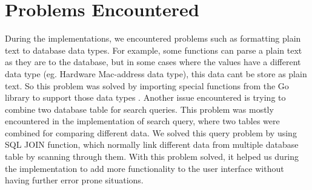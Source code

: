 \section{Problems Encountered}
During the implementations, we encountered problems such as formatting plain text to database data types. For example, some functions can parse a plain text as they are to the database, but in some cases where the values have a different data type (eg. Hardware Mac-address data type), this data cant be store as plain text.  So this problem was solved by importing special functions from the Go library to support those data types . Another issue encountered is trying to combine two database table for search queries. This problem was mostly encountered in the implementation of search query, where two tables were combined for comparing different data.  We solved this query problem by using SQL JOIN function, which normally link different data from multiple database table by scanning through them. With this problem solved, it helped us during the implementation to add more functionality to the user interface without having further error prone situations.



